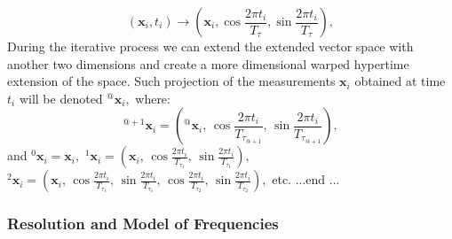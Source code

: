 \begin{equation}
\left(\mathbf{x}_i, t_i\right) \rightarrow \left(\mathbf{x}_i, \cos{\frac{2\pi t_{i}}{T_{\tau}}}, \sin{\frac{2\pi t_{i}}{T_{\tau}}}\right),
\end{equation}
%
During the iterative process we can extend the extended vector space with another two dimensions and create a more dimensional warped hypertime extension of the space. 
Such projection of the measurements $\mathbf{x}_i$ obtained at time $t_i$ will be denoted ${}^{@}\mathbf{x}_{i},$ where:
%
\begin{equation}\label{eqn:extension}
    {}^{@+1}\mathbf{x}_{i} = \left({}^{@}\mathbf{x}_{i}, \,\cos{\frac{2\pi t_{i}}{T_{\tau_{@+1}}}}, \, \sin{\frac{2\pi t_{i}}{T_{\tau_{@+1}}}}\right),
\end{equation}
%
and ${}^{0}\mathbf{x}_{i} = \mathbf{x}_{i},$ ${}^{1}\mathbf{x}_{i} = \left(\mathbf{x}_{i}, \,\cos{\frac{2\pi t_{i}}{T_{\tau_1}}}, \, \sin{\frac{2\pi t_{i}}{T_{\tau_1}}}\right),$ ${}^{2}\mathbf{x}_{i} = \left(\mathbf{x}_{i}, \,\cos{\frac{2\pi t_{i}}{T_{\tau_1}}}, \, \sin{\frac{2\pi t_{i}}{T_{\tau_1}}}, \,\cos{\frac{2\pi t_{i}}{T_{\tau_2}}}, \, \sin{\frac{2\pi t_{i}}{T_{\tau_2}}}\right),$ etc.
...end ...


\subsubsection{Resolution and Model of Frequencies}

